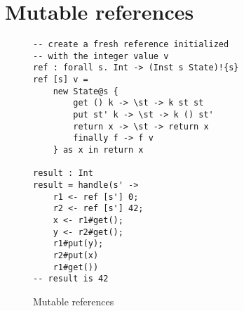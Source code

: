 \iffalse
\section{Mutable references}
\begin{figure}[h]
\caption{Mutable references}
\begin{verbatim}
-- create a fresh reference initialized
-- with the integer value v
ref : forall s. Int -> (Inst s State)!{s}
ref [s] v =
	new State@s {
		get () k -> \st -> k st st
		put st' k -> \st -> k () st'
		return x -> \st -> return x
		finally f -> f v
	} as x in return x

result : Int
result = handle(s' ->
	r1 <- ref [s'] 0;
	r2 <- ref [s'] 42;
	x <- r1#get();
	y <- r2#get();
	r1#put(y);
	r2#put(x)
	r1#get())
-- result is 42
\end{verbatim}
\label{fig:references}
\end{figure}

